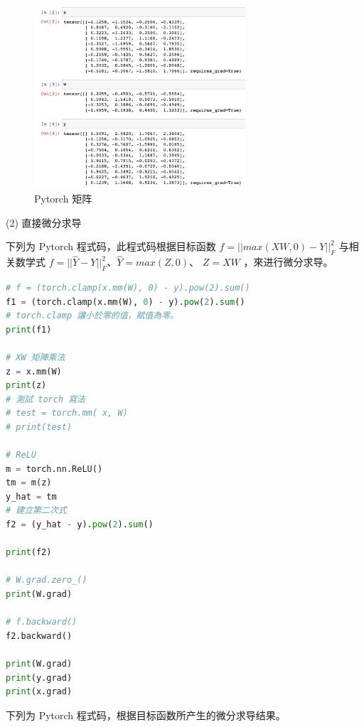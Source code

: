 \documentclass[11pt,UTF8]{ctexart}
\begin{document}
\begin{figure}[H]
\centering 
\includegraphics[width=0.7\textwidth]{c1.png} 
\caption{Pytorch 矩阵}
\label{Code.1}
\end{figure}

\newpage

(2) 直接微分求导
\newline

下列为 Pytorch 程式码，此程式码根据目标函数 $f = ||max(XW,0)-Y||^2_F $ 与相关数学式 $f = ||\hat{Y}-Y||^2_F $、$\hat{Y} = max(Z,0)$、 $Z = XW$ ，來进行微分求导。
\newline


	\begin{lstlisting}[language={python}]
# f = (torch.clamp(x.mm(W), 0) - y).pow(2).sum()
f1 = (torch.clamp(x.mm(W), 0) - y).pow(2).sum()
# torch.clamp 讓小於零的值，賦值為零。
print(f1)

# XW 矩陣乘法
z = x.mm(W)
print(z)
# 測試 torch 寫法
# test = torch.mm( x, W)
# print(test)

# ReLU
m = torch.nn.ReLU()
tm = m(z)
y_hat = tm
# 建立第二次式
f2 = (y_hat - y).pow(2).sum()

print(f2)

# W.grad.zero_()
print(W.grad)

# f.backward()
f2.backward()

print(W.grad)
print(y.grad)
print(x.grad)
	\end{lstlisting}
	
\newpage

下列为 Pytorch 程式码，根据目标函数所产生的微分求导结果。
\newline
\end{document}
